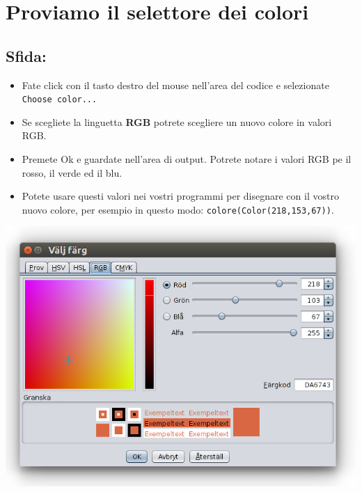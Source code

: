\chapter{Proviamo il selettore dei colori}
\begin{multicols}{2}
\section*{\color{BrickRed}Sfida:}


\begin{itemize}

\item {Fate click con il tasto destro del mouse nell'area del codice e selezionate \lstinline{Choose color...}}
\item {Se scegliete la linguetta {\bf RGB} potrete scegliere un nuovo colore in valori RGB.}
\item {Premete Ok e guardate nell'area di output. Potrete notare i valori RGB pe il rosso, il verde ed il blu.}
\item {Potete usare questi valori nei vostri programmi per disegnare con il vostro nuovo colore, per esempio in questo modo: \lstinline{colore(Color(218,153,67))}.}

\end{itemize}



\columnbreak

\begin{center}
\includegraphics[width=14.0cm]{../img/color-chooser-rgb-sv.png}
\end{center}

\end{multicols}

